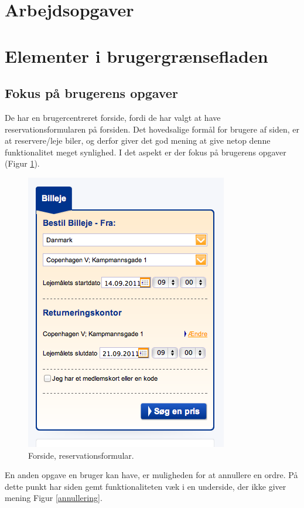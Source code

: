 \documentclass[a4paper]{article}
\title{}
\author{Claus Skou Nielsen, Michael Budde, Kasper Passov, Niels Ørbæk
Christensen}
\begin{document}
\section{Arbejdsopgaver}
\section{Elementer i brugergrænsefladen}
\subsection{Fokus på brugerens opgaver}
De har en brugercentreret forside, fordi de har valgt at have
reservationsformularen på forsiden. Det hovedsalige formål for brugere af siden,
er at reservere/leje biler, og derfor giver det god mening at give netop denne
funktionalitet meget synlighed. I det aspekt er der fokus på brugerens opgaver
(Figur \ref{forside}).

\begin{figure}[htbp]
  \begin{center}
    \includegraphics{1.png}
  \end{center}
  \caption{Forside, reservationsformular.}
  \label{forside}
\end{figure}

En anden opgave en bruger kan have, er muligheden for at annullere en ordre. På
dette punkt har siden gemt funktionaliteten væk i en underside, der ikke giver
mening Figur \ref{annullering}.
\end{document}
